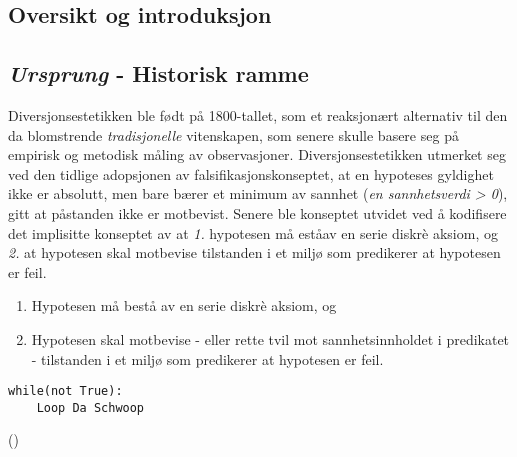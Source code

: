 
\subsection{Oversikt og introduksjon}


\subsection{{\itshape Ursprung} - Historisk ramme}

Diversjonsestetikken ble født på 1800-tallet, som et reaksjonært alternativ til den da blomstrende \emph{tradisjonelle} vitenskapen, som senere skulle basere seg på empirisk og metodisk måling av observasjoner. Diversjonsestetikken utmerket seg ved den tidlige adopsjonen av falsifikasjonskonseptet, at en hypoteses gyldighet ikke er absolutt, men bare bærer et minimum av sannhet (\emph{en sannhetsverdi > 0}), gitt at påstanden ikke er motbevist. Senere ble konseptet utvidet ved å kodifisere det implisitte konseptet av at \emph{1.} hypotesen må eståav en serie diskr\`{e} aksiom, og \emph{2.} at hypotesen skal motbevise tilstanden i et miljø som predikerer at hypotesen er feil.
\begin{enumerate}
	\item Hypotesen må bestå av en serie diskr\`{e} aksiom, og
	\item Hypotesen skal motbevise - eller rette tvil mot sannhetsinnholdet i predikatet -  tilstanden i et miljø som predikerer at hypotesen er feil.
\end{enumerate}

\begin{lstlisting}[label=some-code,caption=Komputert taktil hydrotermisk tilstandsestimasjon]
while(not True):
	Loop Da Schwoop
\end{lstlisting}

\newpage
\layout()

